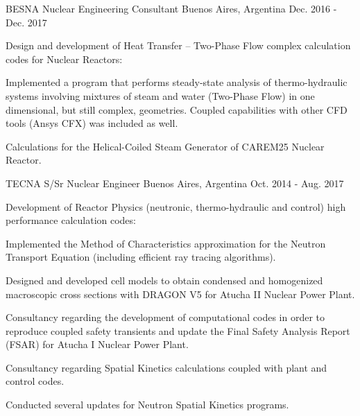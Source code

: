 \begin{cventries}
  \cventry
    {BESNA}
    {Nuclear Engineering Consultant}
    {Buenos Aires, Argentina}
    {Dec. 2016 - Dec. 2017}
    {
      \begin{cvitems}
        \item{Design and development of Heat Transfer – Two-Phase Flow complex calculation
        codes for Nuclear Reactors:
          \vspace{+6.0mm}
          \begin{cvitems}
            \item Implemented a program that performs steady-state analysis of
            thermo-hydraulic systems involving mixtures of steam and water (Two-Phase Flow)
            in one dimensional, but still complex, geometries. Coupled capabilities with
            other CFD tools (Ansys CFX) was included as well.
            \item Calculations for the Helical-Coiled Steam Generator of CAREM25 Nuclear
            Reactor.
          \end{cvitems}
          \vspace{+4.0mm}
        }
      \end{cvitems}
      \vspace{1em}
    }

  \cventry
    {TECNA}
    {S/Sr Nuclear Engineer}
    {Buenos Aires, Argentina}
    {Oct. 2014 - Aug. 2017}
    {
    \begin{cvitems}
        \item{Development of Reactor Physics (neutronic, thermo-hydraulic and control) high
        performance calculation codes:
            \vspace{+6.0mm}
            \begin{cvitems}
                \item Implemented the Method of Characteristics approximation for the
                Neutron Transport Equation (including efficient ray tracing algorithms).
                \item Designed and developed cell models to obtain condensed and homogenized
                macroscopic cross sections with DRAGON V5 for Atucha II Nuclear Power Plant.
                \item Consultancy regarding the development of computational codes in order
                to reproduce coupled safety transients and update the Final Safety Analysis
                Report (FSAR) for Atucha I Nuclear Power Plant.
                \item Consultancy regarding Spatial Kinetics calculations coupled with plant
                and control codes.
                \item Conducted several updates for Neutron Spatial Kinetics programs.
            \end{cvitems}
            \vspace{+4.0mm}
        }
    \end{cvitems}
    \vspace{1em}
    }

\end{cventries}
